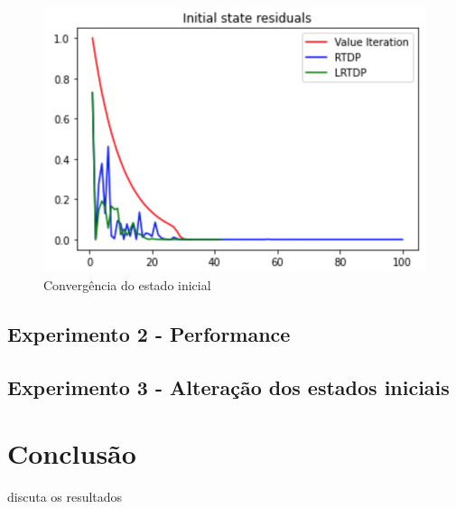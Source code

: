 \documentclass[letterpaper]{article}
\begin{document}
\begin{figure}[t]
    \centering
    \includegraphics[width=0.9\columnwidth]{initial-state-convergency}
    \caption{Convergência do estado inicial}
    \label{fig:initial-state-convergency}
\end{figure}


\subsection{Experimento 2 - Performance}


\subsection{Experimento 3 - Alteração dos estados iniciais}


\section{Conclusão}
discuta os resultados



\end{document}
